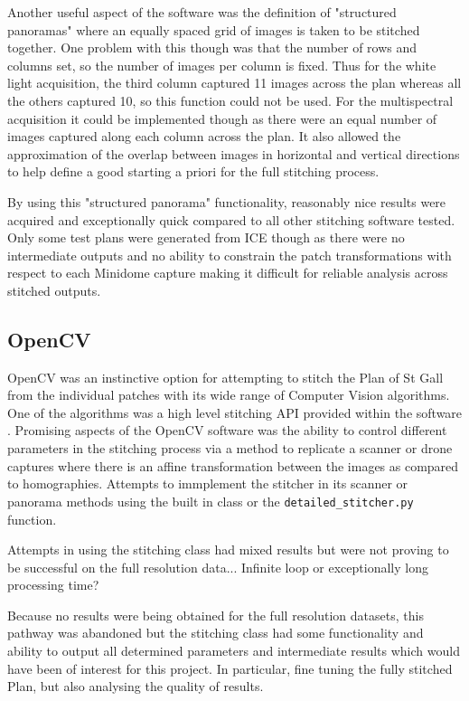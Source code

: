 Another useful aspect of the software was the definition of "structured panoramas" where an equally spaced grid of images is taken to be stitched together. One problem with this though was that the number of rows and columns set, so the number of images per column is fixed. Thus for the white light acquisition, the third column captured 11 images across the plan whereas all the others captured 10, so this function could not be used. For the multispectral acquisition it could be implemented though as there were an equal number of images captured along each column across the plan. It also allowed the approximation of the overlap between images in horizontal and vertical directions to help define a good starting a priori for the full stitching process.

By using this "structured panorama" functionality, reasonably nice results were acquired and exceptionally quick compared to all other stitching software tested. Only some test plans were generated from ICE though as there were no intermediate outputs and no ability to constrain the patch transformations with respect to each Minidome capture making it difficult for reliable analysis across stitched outputs.

\subsection{OpenCV}
\label{sec:OpenCv}
OpenCV was an instinctive option for attempting to stitch the Plan of St Gall from the individual patches with its wide range of Computer Vision algorithms. One of the algorithms was a high level stitching API provided within the software \cite{OpenCV2019}. Promising aspects of the OpenCV software was the ability to control different parameters in the stitching process via a method to replicate a scanner or drone captures where there is an affine transformation between the images as compared to homographies. Attempts to immplement the stitcher in its scanner or panorama methods using the built in class or the \texttt{detailed\_stitcher.py} function.

Attempts in using the stitching class had mixed results but were not proving to be successful on the full resolution data... Infinite loop or exceptionally long processing time?

Because no results were being obtained for the full resolution datasets, this pathway was abandoned but the stitching class had some functionality and ability to output all determined parameters and intermediate results which would have been of interest for this project. In particular, fine tuning the fully stitched Plan, but also analysing the quality of results.

